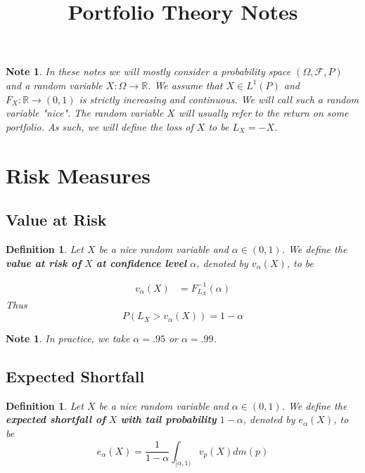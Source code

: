 \documentclass[12pt]{amsart}
\newtheorem{defn}[thm]{Definition}
\newtheorem{note}[thm]{Note}
\newcommand{\al}{\alpha}
\newcommand{\Om}{\Omega}
\newcommand{\R}{\mathbb{R}}
\newcommand{\MF}{\mathcal{F}}
\begin{document}
\title{Portfolio Theory Notes}
\maketitle

\tableofcontents

\begin{note}
In these notes we will mostly consider a probability space $(\Om, \MF, P)$ and a random variable $X: \Om \rightarrow \R$. We assume that $X \in L^1(P)$ and $F_X:\R \rightarrow (0,1)$ is strictly increasing and continuous. We will call such a random variable "nice". The random variable $X$ will usually refer to the return on some portfolio. As such, we will define the loss of $X$ to be $L_X = -X$.
\end{note}

\section{Risk Measures}

\subsection{Value at Risk}

\begin{defn}
Let $X$ be a nice random variable and $\al \in (0,1)$. We define the \textbf{value at risk of } $X$ \textbf{at confidence level } $\al$, denoted by $v_{\al}(X)$, to be 

\begin{align*}
v_{\al}(X) 
&= F^{-1}_{L_X}(\al)
\end{align*}
Thus $$P(L_X > v_{\al}(X)) = 1- \al$$
\end{defn}

\begin{note}
In practice, we take $\al= .95$ or $\al= .99$. 
\end{note}

\subsection{Expected Shortfall}

 \begin{defn}
Let $X$ be a nice random variable and $\al\in (0,1)$. We define the \textbf{expected shortfall of } $X$ \textbf{with tail probability } $1-\al$, denoted by $e_{\al}(X)$, to be $$e_{\al}(X) = \frac{1}{1-\al}\int_{[\al,1)}v_p(X)dm(p)$$
\end{defn}
\end{document}
